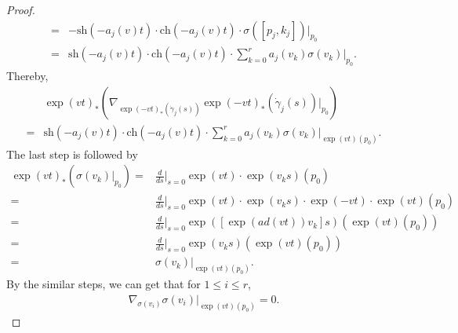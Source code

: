 \documentclass[12pt]{amsart}
\begin{document}
\begin{proof}
\begin{align*}
        =& -\mathrm{sh}(-a_j(v)t)\cdot \mathrm{ch}(-a_j(v)t)\cdot\sigma([p_j, k_j])|_{p_0}\\
        =& \mathrm{sh}(-a_j(v)t)\cdot \mathrm{ch}(-a_j(v)t)\cdot \sum_{k = 0}^{r}a_j(v_k)\sigma(v_k)|_{p_0}. 
    \end{align*}
    Thereby, 
    \begin{align*}
        &\exp(vt)_*(\nabla_{\exp(-vt)_*(\dot\gamma_j(s))}\exp(-vt)_*(\dot\gamma_j(s))|_{p_0})\\
        =& \mathrm{sh}(-a_j(v)t)\cdot \mathrm{ch}(-a_j(v)t)\cdot \sum_{k = 0}^{r}a_j(v_k)\sigma(v_k)|_{\exp(vt)(p_0)}.
    \end{align*}
    The last step is followed by 
    \begin{align*}
        \exp(vt)_*(\sigma(v_k)|_{p_0}) 
        =& \frac{d}{ds} \bigg|_{s = 0} \exp(vt)\cdot \exp(v_ks)(p_0)\\
        =& \frac{d}{ds} \bigg|_{s = 0} \exp(vt)\cdot \exp(v_ks)\cdot \exp(-vt)\cdot \exp(vt)(p_0)\\
        =& \frac{d}{ds} \bigg|_{s = 0} \exp([\exp(ad(vt))v_k]s)(\exp(vt)(p_0))\\
        =& \frac{d}{ds} \bigg|_{s = 0} \exp(v_ks)(\exp(vt)(p_0))\\
        =& \sigma(v_k)|_{\exp(vt)(p_0)}.
    \end{align*}
    By the similar steps, we can get that for $1 \leq i \leq r$, 
    \begin{align*}
        \nabla_{\sigma(v_i)}\sigma(v_i)|_{\exp(vt)(p_0)} = 0.
    \end{align*}
\end{proof}

 
\end{document}
